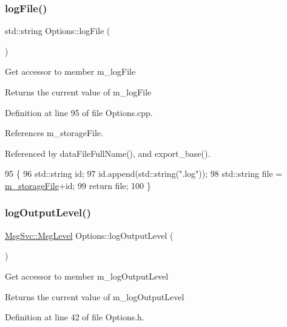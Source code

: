 \subsubsection{\texorpdfstring{log\+File()}{logFile()}}
{\footnotesize\ttfamily std\+::string Options\+::log\+File (\begin{DoxyParamCaption}{ }\end{DoxyParamCaption})}

Get accessor to member m\+\_\+log\+File \begin{DoxyReturn}{Returns}
the current value of m\+\_\+log\+File 
\end{DoxyReturn}


Definition at line 95 of file Options.\+cpp.



References m\+\_\+storage\+File.



Referenced by data\+File\+Full\+Name(), and export\+\_\+base().


\begin{DoxyCode}
95                             \{
96   std::string id;
97   \textcolor{keywordtype}{id}.append(std::string(\textcolor{stringliteral}{".log"}));
98   std::string file = \hyperlink{classOptions_a4d952db4e93d3aae6db86d89faa3677a}{m\_storageFile}+id;
99   \textcolor{keywordflow}{return} file;
100 \}
\end{DoxyCode}
\mbox{\label{classOptions_a2d11716f34070dd7991648a26eb5d244}} 
\subsubsection{\texorpdfstring{log\+Output\+Level()}{logOutputLevel()}}
{\footnotesize\ttfamily \hyperlink{classMsgSvc_ae671eb7301996cd049d2da8a65925926}{Msg\+Svc\+::\+Msg\+Level} Options\+::log\+Output\+Level (\begin{DoxyParamCaption}{ }\end{DoxyParamCaption})\hspace{0.3cm}{\ttfamily [inline]}}

Get accessor to member m\+\_\+log\+Output\+Level \begin{DoxyReturn}{Returns}
the current value of m\+\_\+log\+Output\+Level 
\end{DoxyReturn}


Definition at line 42 of file Options.\+h.



